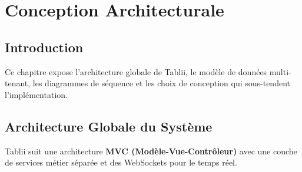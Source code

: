 \documentclass[12pt,a4paper]{report}
\begin{document}
\cleardoublepage
\chapter{Conception Architecturale}

\section{Introduction}

Ce chapitre expose l'architecture globale de Tablii, le modèle de données multi-tenant, les diagrammes de séquence et les choix de conception qui sous-tendent l'implémentation.

\section{Architecture Globale du Système}

Tablii suit une architecture \textbf{MVC (Modèle-Vue-Contrôleur)} avec une couche de services métier séparée et des WebSockets pour le temps réel.
\end{document}
